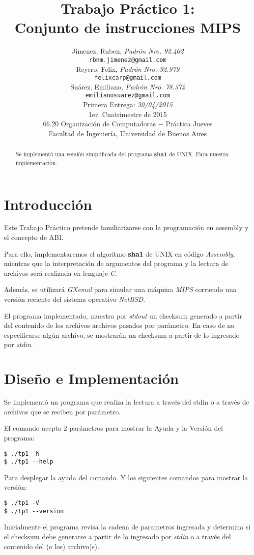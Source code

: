 \documentclass[a4paper,10pt]{article}
\title{     \textbf{Trabajo Práctico 1: \\ Conjunto de instrucciones MIPS}}
\author{
            Jimenez, Ruben, \textit{Padrón Nro. 92.402}                            \\
            \texttt{ rbnm.jimenez@gmail.com }                                   \\[2.5ex]
            Reyero, Felix, \textit{Padrón Nro. 92.979}                             \\
            \texttt{ felixcarp@gmail.com }                                    \\[2.5ex]
            Suárez, Emiliano, \textit{Padrón Nro. 78.372}                             \\
            \texttt{ emilianosuarez@gmail.com }                                    \\[2.5ex]
    Primera Entrega: \textit{30/04/2015}                                            \\[1.5ex]
            \normalsize{1er. Cuatrimestre de 2015}                                  \\
            \normalsize{66.20 Organización de Computadoras  $-$ Práctica Jueves}    \\
            \normalsize{Facultad de Ingeniería, Universidad de Buenos Aires}        \\
       }
\date{}
\begin{document}
\maketitle
\thispagestyle{empty}   %

\newpage
\begin{abstract}
Se implementó una versión simplificada del programa \textbf{sha1} de UNIX. Para nuestra implementación.
\end{abstract}

\section{Introducción}

Este Trabajo Práctico pretende familiarizarse con la programación en assembly y el concepto de ABI.

Para ello, implementaremos el algoritmo \textbf{sha1} de UNIX en código \textsl{Assembly}, mientras que la interpretación de argumentos del programa y la lectura de archivos será realizada en lenguaje \textsl{C}.

Además, se utilizará \textsl{GXemul} para simular una máquina \textsl{MIPS} corriendo una versión reciente del sistema operativo \textsl{NetBSD}.

El programa implementado, muestra por \textsl{stdout} un checksum generado a partir del contenido de los archivos archivos pasados por parámetro. En caso de no especificarse algún archivo, se mostrarán un checksum a partir de lo ingresado por \textsl{stdin}.

\newpage
\section{Diseño e Implementación}

Se implementó un programa que realiza la lectura a través del stdin o a través de archivos que se reciben por parámetro.

El comando acepta 2 parámetros para mostrar la Ayuda y la Versión del programa:
\begin{verbatim}
$ ./tp1 -h
$ ./tp1 --help
\end{verbatim}
Para desplegar la ayuda del comando.
Y los siguientes comandos para mostrar la versión:
\begin{verbatim}
$ ./tp1 -V
$ ./tp1 --version
\end{verbatim}

Inicialmente el programa revisa la cadena de parametros ingresada y determina si el checksum debe generarse a partir de lo ingresado por \textsl{stdin} o a través del contenido del (o los) archivo(s).
\end{document}
